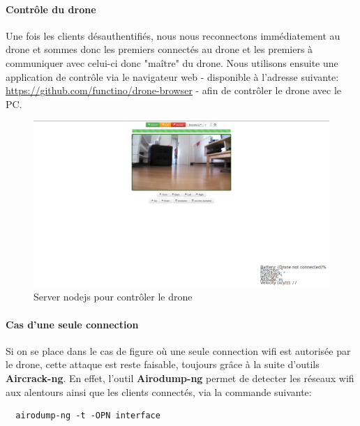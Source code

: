 \paragraph{Contrôle du drone}
Une fois les clients désauthentifiés, nous nous reconnectons immédiatement au drone et sommes donc les premiers connectés au drone et les premiers à communiquer avec celui-ci donc "maître" du drone. Nous utilisons ensuite une application de contrôle via le navigateur web - disponible à l'adresse suivante: \url{https://github.com/functino/drone-browser} - afin de contrôler le drone avec le PC.

\begin{figure}[H]
  \centering
  \includegraphics[scale=0.2]{images/drone_browser}
  \caption{Server nodejs pour contrôler le drone}
\end{figure}

\paragraph{Cas d'une seule connection}
Si on se place dans le cas de figure où une seule connection wifi est autorisée par le drone, cette attaque est reste faisable, toujours grâce à la suite d'outils \textbf{Aircrack-ng}. En effet, l'outil \textbf{Airodump-ng} permet de detecter les réseaux wifi aux alentours ainsi que les clients connectés, via la commande suivante:
\begin{verbatim}
  airodump-ng -t -OPN interface
\end{verbatim}


